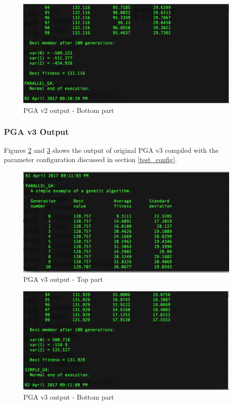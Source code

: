 \begin{figure}[!htb]
	\center
        \includegraphics[width= \linewidth]{figs/tests/pgav2_bottom.png}
    \caption{PGA v2 output - Bottom part}
     \label{fig:test_pgav2_bottom}
\end{figure}

\subsubsection{PGA v3 Output}

Figures \ref{fig:test_pgav3_top} and \ref{fig:test_pgav3_bottom} shows the output of original PGA v3 compiled with the parameter configuration discussed in section \ref{test_config}.

\begin{figure}[!htb]
	\center
        \includegraphics[width= \linewidth]{figs/tests/pgav3_top.png}
    \caption{PGA v3 output - Top part}
     \label{fig:test_pgav3_top}
\end{figure}

\begin{figure}[!htb]
	\center
        \includegraphics[width= \linewidth]{figs/tests/pgav3_bottom.png}
    \caption{PGA v3 output - Bottom part}
     \label{fig:test_pgav3_bottom}
\end{figure}

 

